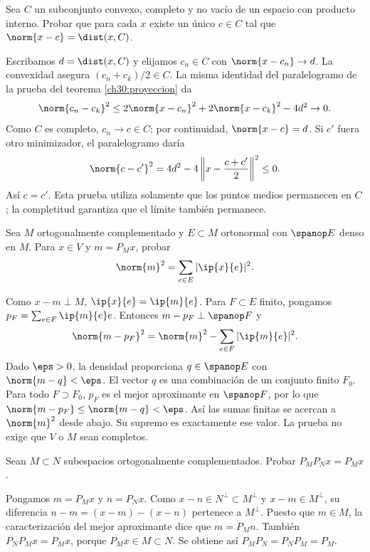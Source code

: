 \begin{ejercicio}\label{ej:lectura-30-1}
Sea $C$ un subconjunto convexo, completo y no vacío de un espacio con producto interno. Probar que para cada $x$ existe un único $c\in C$ tal que $\norm{x-c}=\dist(x,C)$.
\end{ejercicio}
\begin{solucion}
Escribamos $d=\dist(x,C)$ y elijamos $c_n\in C$ con $\norm{x-c_n}\to d$. La convexidad asegura $(c_n+c_k)/2\in C$. La misma identidad del paralelogramo de la prueba del teorema \ref{ch30:proyeccion} da
\[
 \norm{c_n-c_k}^{2}\leq2\norm{x-c_n}^{2}+2\norm{x-c_k}^{2}-4d^{2}\to0.
\]
Como $C$ es completo, $c_n\to c\in C$; por continuidad, $\norm{x-c}=d$. Si $c'$ fuera otro minimizador, el paralelogramo daría
\[
 \norm{c-c'}^{2}=4d^{2}-4\left\|x-\frac{c+c'}2\right\|^{2}\leq0.
\]
Así $c=c'$. Esta prueba utiliza solamente que los puntos medios permanecen en $C$; la completitud garantiza que el límite también permanece.
\end{solucion}

\begin{ejercicio}\label{ej:lectura-30-2}
Sea $M$ ortogonalmente complementado y $E\subset M$ ortonormal con $\spanop E$ denso en $M$. Para $x\in V$ y $m=P_Mx$, probar
\[
 \norm{m}^{2}=\sum_{e\in E}|\ip{x}{e}|^{2}.
\]
\end{ejercicio}
\begin{solucion}
Como $x-m\perp M$, $\ip{x}{e}=\ip{m}{e}$. Para $F\subset E$ finito, pongamos $p_F=\sum_{e\in F}\ip{m}{e}e$. Entonces $m-p_F\perp\spanop F$ y
\[
 \norm{m-p_F}^{2}=\norm{m}^{2}-\sum_{e\in F}|\ip{m}{e}|^{2}.
\]
Dado $\eps>0$, la densidad proporciona $q\in\spanop E$ con $\norm{m-q}<\eps$. El vector $q$ es una combinación de un conjunto finito $F_0$. Para todo $F\supset F_0$, $p_F$ es el mejor aproximante en $\spanop F$, por lo que $\norm{m-p_F}\leq\norm{m-q}<\eps$. Así las sumas finitas se acercan a $\norm{m}^{2}$ desde abajo. Su supremo es exactamente ese valor. La prueba no exige que $V$ o $M$ sean completos.
\end{solucion}

\begin{ejercicio}\label{ej:lectura-30-3}
Sean $M\subset N$ subespacios ortogonalmente complementados. Probar $P_MP_Nx=P_Mx$.
\end{ejercicio}
\begin{solucion}
Pongamos $m=P_Mx$ y $n=P_Nx$. Como $x-n\in N^{\perp}\subset M^{\perp}$ y $x-m\in M^{\perp}$, su diferencia $n-m=(x-m)-(x-n)$ pertenece a $M^{\perp}$. Puesto que $m\in M$, la caracterización del mejor aproximante dice que $m=P_Mn$. También $P_NP_Mx=P_Mx$, porque $P_Mx\in M\subset N$. Se obtiene así $P_MP_N=P_NP_M=P_M$.
\end{solucion}

